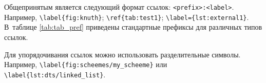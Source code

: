 \appendix
\renewcommand{\hdngalign}{\centering}   %
\renewcommand{\hdngaligni}{}			%
\setlength{\otstuplen}{0pt}
\renewcommand*{\chapnumfont}{}
\renewcommand*{\printchaptername}{\appendixname}
\setlength{\midchapskip}{6pt}
\renewcommand*{\afterchapternum}{\par\nobreak\vskip \midchapskip}
\renewcommand{\thechapter}{\Asbuk{chapter}}


\label{app:A}

Общепринятым является следующий формат ссылок: \linebreak
\texttt{<prefix>:<label>}.
Например, \verb+\label{fig:knuth}+; \verb+\ref{tab:test1}+;
\verb+\label={lst:external1}+.
В~таблице \cref{tab:tab_pref} приведены стандартные префиксы для различных
типов ссылок.

\begin{table}[htbp]
    \captionsetup{justification=centering}
\end{table}

Для упорядочивания ссылок можно использовать разделительные символы.
Например, \verb+\label{fig:scheemes/my_scheeme}+ или \verb+\label{lst:dts/linked_list}+.
